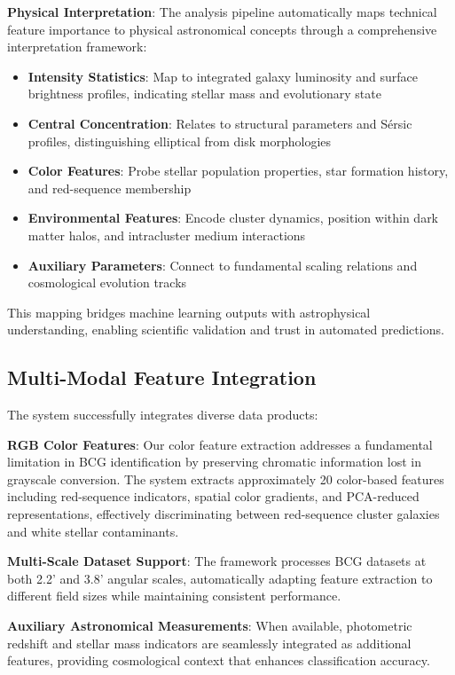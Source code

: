 \documentclass[twocolumn,10pt]{aastex631}
\begin{document}
\textbf{Physical Interpretation}: The analysis pipeline automatically maps technical feature importance to physical astronomical concepts through a comprehensive interpretation framework:

\begin{itemize}
\item \textbf{Intensity Statistics}: Map to integrated galaxy luminosity and surface brightness profiles, indicating stellar mass and evolutionary state
\item \textbf{Central Concentration}: Relates to structural parameters and Sérsic profiles, distinguishing elliptical from disk morphologies
\item \textbf{Color Features}: Probe stellar population properties, star formation history, and red-sequence membership
\item \textbf{Environmental Features}: Encode cluster dynamics, position within dark matter halos, and intracluster medium interactions
\item \textbf{Auxiliary Parameters}: Connect to fundamental scaling relations and cosmological evolution tracks
\end{itemize}

This mapping bridges machine learning outputs with astrophysical understanding, enabling scientific validation and trust in automated predictions.

\subsection{Multi-Modal Feature Integration}

The system successfully integrates diverse data products:

\textbf{RGB Color Features}: Our color feature extraction addresses a fundamental limitation in BCG identification by preserving chromatic information lost in grayscale conversion. The system extracts approximately 20 color-based features including red-sequence indicators, spatial color gradients, and PCA-reduced representations, effectively discriminating between red-sequence cluster galaxies and white stellar contaminants.

\textbf{Multi-Scale Dataset Support}: The framework processes BCG datasets at both 2.2' and 3.8' angular scales, automatically adapting feature extraction to different field sizes while maintaining consistent performance.

\textbf{Auxiliary Astronomical Measurements}: When available, photometric redshift and stellar mass indicators are seamlessly integrated as additional features, providing cosmological context that enhances classification accuracy.
\end{document}
